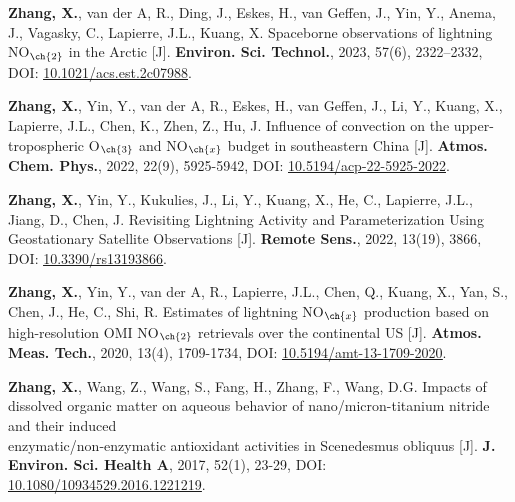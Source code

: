 \begin{enumerate}[label={[\arabic*]}, leftmargin=20pt, widest=0, itemindent=*, topsep=0pt, partopsep=0pt, parsep=0pt]

\item \textbf{Zhang, X.}, van der A, R., Ding, J., Eskes, H., van Geffen, J., Yin, Y., Anema, J.,
Vagasky, C., Lapierre, J.L., Kuang, X. Spaceborne observations of lightning NO$_{\ch{2}}$ in the Arctic [J].
\textbf{Environ. Sci. Technol.}, 2023, 57(6), 2322--2332,
DOI: \underline{\href{https://doi.org/10.1021/acs.est.2c07988}{10.1021/acs.est.2c07988}}.

\item \textbf{Zhang, X.}, Yin, Y., van der A, R., Eskes, H., van Geffen, J., Li, Y., Kuang, X., Lapierre,
J.L., Chen, K., Zhen, Z., Hu, J. Influence of convection on the
upper-tropospheric O$_{\ch{3}}$ and NO$_{\ch{x}}$ budget in southeastern China [J].
\textbf{Atmos. Chem. Phys.}, 2022, 22(9), 5925-5942,
DOI: \underline{\href{https://doi.org/10.5194/acp-22-5925-2022}{10.5194/acp-22-5925-2022}}.

\item \textbf{Zhang, X.}, Yin, Y., Kukulies, J., Li, Y., Kuang, X., He, C., Lapierre, J.L., Jiang, D., Chen,
J. Revisiting Lightning Activity and Parameterization Using Geostationary
Satellite Observations [J].
\textbf{Remote Sens.}, 2022, 13(19), 3866,
DOI: \underline{\href{https://doi.org/10.3390/rs13193866}{10.3390/rs13193866}}.

\item \textbf{Zhang, X.}, Yin, Y., van der A, R., Lapierre, J.L., Chen, Q., Kuang, X., Yan, S., Chen, J.,
He, C., Shi, R. Estimates of lightning NO$_{\ch{x}}$ production based on high-resolution
OMI NO$_{\ch{2}}$ retrievals over the continental US [J].
\textbf{Atmos. Meas. Tech.}, 2020, 13(4), 1709-1734,
DOI: \underline{\href{https://doi.org/10.5194/amt-13-1709-2020}{10.5194/amt-13-1709-2020}}.

\item \textbf{Zhang, X.}, Wang, Z., Wang, S., Fang, H., Zhang, F., Wang, D.G.
Impacts of dissolved organic matter on aqueous behavior of nano/micron-titanium nitride and their induced \\
enzymatic/non-enzymatic antioxidant activities in Scenedesmus obliquus [J].
\textbf{J. Environ. Sci. Health A}, 2017, 52(1), 23-29,
DOI: \underline{\href{https://doi.org/10.1080/10934529.2016.1221219}{10.1080/10934529.2016.1221219}}.

\end{enumerate}

